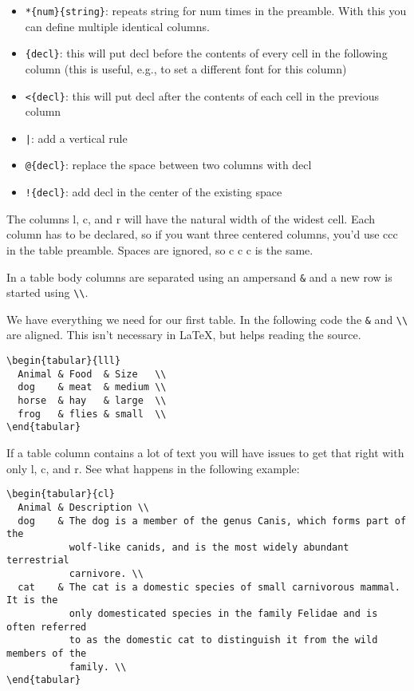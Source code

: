 \documentclass{article}
\begin{document}
\begin{itemize}
    \item \texttt{*\{num\}\{string\}}: repeats string for num times in the preamble. With this you can define multiple identical columns.
    \item \texttt{\>\{decl\}}: this will put decl before the contents of every cell in the following column (this is useful, e.g., to set a different font for this column)
    \item \texttt{<\{decl\}}: this will put decl after the contents of each cell in the previous column
    \item \texttt{|}: add a vertical rule
    \item \texttt{@\{decl\}}: replace the space between two columns with decl
    \item \texttt{!\{decl\}}: add decl in the center of the existing space
\end{itemize}

The columns l, c, and r will have the natural width of the widest cell. Each column has to be declared, so if you want three centered columns, you’d use ccc in the table preamble. Spaces are ignored, so c c c is the same.

In a table body columns are separated using an ampersand \texttt{\&} and a new row is started using \verb|\\|.

We have everything we need for our first table. In the following code the \verb|&| and \verb|\\| are aligned. This isn’t necessary in LaTeX, but helps reading the source.

\begin{verbatim}
\begin{tabular}{lll}
  Animal & Food  & Size   \\
  dog    & meat  & medium \\
  horse  & hay   & large  \\
  frog   & flies & small  \\
\end{tabular}
\end{verbatim}

If a table column contains a lot of text you will have issues to get that right with only l, c, and r. See what happens in the following example:

\begin{verbatim}
\begin{tabular}{cl}
  Animal & Description \\
  dog    & The dog is a member of the genus Canis, which forms part of the
           wolf-like canids, and is the most widely abundant terrestrial
           carnivore. \\
  cat    & The cat is a domestic species of small carnivorous mammal. It is the
           only domesticated species in the family Felidae and is often referred
           to as the domestic cat to distinguish it from the wild members of the
           family. \\
\end{tabular}
\end{verbatim}
\end{document}
